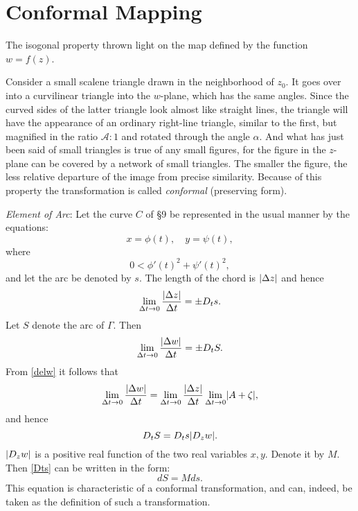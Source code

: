 \documentclass[twosided]{memoir}
\begin{document}
\section{Conformal Mapping}
The isogonal property thrown light on the map defined by the function $w=f(z)$. 

\begin{figure}[htbp]
\centering
{}
\end{figure}
Consider a small scalene triangle drawn in the neighborhood of $z_0$. It goes over into a curvilinear triangle into the $w$-plane, which has the same angles. Since the curved sides of the latter triangle look almost like straight lines, the triangle will have the appearance of an ordinary right-line triangle, similar to the first, but magnified in the ratio $\mathcal{A}:1$ and rotated through the angle $\alpha $. And what has just been said of small triangles is true of any small figures, for the figure in the $z$-plane can be covered by a network of small triangles. The smaller the figure, the less relative departure of the image from precise similarity. Because of this property the transformation is called \emph{conformal} (preserving form).

\emph{Element of Arc}: Let the curve $C$ of \S 9 be represented in the usual manner by the equations:
\[
	x=\phi (t), \quad y=\psi(t),
\] where
\[
	0<\phi '(t)^2+\psi'(t)^2,
\] and let the arc be denoted by $s$. The length of the chord is $\abs*{\Delta z} $ and hence
\[
\lim\limits_{\Delta t \to 0} \frac{\abs*{\Delta z} }{\Delta t} =\pm D_ts
.\] Let $S$ denote the arc of $\Gamma$. Then
\[
\lim\limits_{\Delta t \to 0} \frac{\abs*{\Delta w} }{\Delta t} =\pm D_t S
.\] From \ref{delw} it follows that
\[
\lim\limits_{\Delta t \to 0} \frac{\abs*{\Delta w} }{\Delta t} =\lim\limits_{\Delta t \to 0} \frac{\abs*{\Delta z} }{\Delta t} \lim\limits_{\Delta t \to 0} \abs*{A+\zeta} 
,\] and hence
\begin{equation}\label{Dts}
D_tS=D_ts \abs*{D_z w} 
.\end{equation} $\abs*{D_zw} $ is a positive real function of the two real variables $x, y$. Denote it by $M$. Then \ref{Dts} can be written in the form:
\[
dS=M ds
.\] This equation is characteristic of a conformal transformation, and can, indeed, be taken as the definition of such a transformation. 
\end{document}
